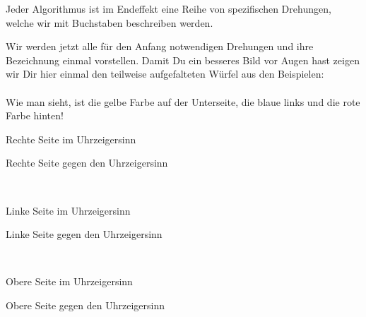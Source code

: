 Jeder Algorithmus ist im Endeffekt eine Reihe von spezifischen Drehungen, welche wir mit Buchstaben beschreiben werden.

Wir werden jetzt alle für den Anfang notwendigen Drehungen und ihre Bezeichnung einmal vorstellen.
Damit Du ein besseres Bild vor Augen hast zeigen wir Dir hier einmal den teilweise aufgefalteten Würfel aus den Beispielen:\\[1em]

\RubikCubeSolved%
\\[1em]

Wie man sieht, ist die gelbe Farbe auf der Unterseite, die blaue links und die rote Farbe hinten!

\begin{instruction}{Rechte Seite im Uhrzeigersinn}
  \vspace{1.3em}
  \RubikCubeSolved%
  \quad{}
\end{instruction}
\hfil
\begin{instruction}{Rechte Seite gegen den Uhrzeigersinn}
  \RubikCubeSolved%
  \quad{}
\end{instruction}\\[5em]
\begin{instruction}{Linke Seite im Uhrzeigersinn}
  \vspace{1.3em}
  \RubikCubeSolved%
  \quad{}
\end{instruction}
\hfil
\begin{instruction}{Linke Seite gegen den Uhrzeigersinn}
  \RubikCubeSolved%
  \quad{}
\end{instruction}
\\[5em]
\begin{instruction}{Obere Seite im Uhrzeigersinn}
  \vspace{1.3em}
  \RubikCubeSolved%
  \quad{}
\end{instruction}
\hfil
\begin{instruction}{Obere Seite gegen den Uhrzeigersinn}
  \RubikCubeSolved%
  \quad{}
\end{instruction}
